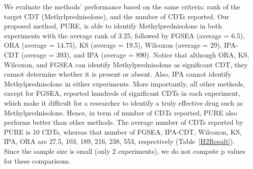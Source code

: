 We evaluate the methods' performance based on the same criteria: rank of the target CDT (Methylprednisolone), and the number of CDTs reported. Our proposed method, PURE, is able to identify Methylprednisolone in both experiments with the average rank of 3.25, followed by FGSEA (average = 6.5), ORA (average = 14.75), KS (average = 19.5), Wilcoxon (average = 29), IPA-CDT (average = 393), and IPA (average = 890). Notice that although ORA, KS, Wilcoxon, and FGSEA can identify Methylprednisolone as significant CDT, they cannot determine whether it is present or absent. Also, IPA cannot identify Methylprednisolone in either experiments. More importantly, all other methods, except for FGSEA, reported hundreds of significant CDTs in each experiment, which make it difficult for a researcher to identify a truly effective drug such as Methylprednisolone. Hence, in term of number of CDTs reported, PURE also performs better than other methods. The average number of CDTs reported by PURE is 10 CDTs, whereas that number of FGSEA, IPA-CDT, Wilcoxon, KS, IPA, ORA are 27.5, 103, 189, 216, 238, 553, respectively (Table~\ref{H2Result}). Since the sample size is small (only 2 experiments), we do not compute p values for these comparisons.



